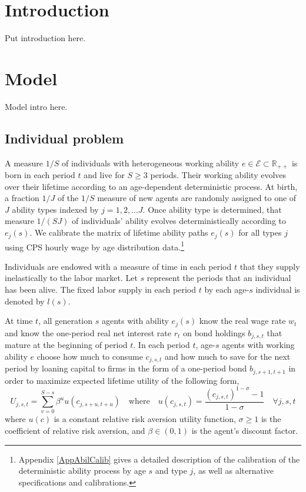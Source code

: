 \documentclass[letterpaper,12pt]{article}
\theoremstyle{definition}
\begin{document}
\begin{spacing}{1.5}

\section{Introduction}\label{SecIntro}

  Put introduction here.


\section{Model}\label{SecModel}

  Model intro here.


  \subsection{Individual problem}\label{SecIndProb}

    A measure $1/S$ of individuals with heterogeneous working ability $e \in\mathcal{E}\subset\mathbb{R}_{++}$ is born in each period $t$ and live for $S\geq 3$ periods. Their working ability evolves over their lifetime according to an age-dependent deterministic process. At birth, a fraction $1/J$ of the $1/S$ measure of new agents are randomly assigned to one of $J$ ability types indexed by $j=1,2,...J$. Once ability type is determined, that measure $1/(SJ)$ of individuals' ability evolves deterministically according to $e_j(s)$. We calibrate the matrix of lifetime ability paths $e_j(s)$ for all types $j$ using CPS hourly wage by age distribution data.\footnote{Appendix \ref{AppAbilCalib} gives a detailed description of the calibration of the deterministic ability process by age $s$ and type $j$, as well as alternative specifications and calibrations.}

    Individuals are endowed with a measure of time in each period $t$ that they supply inelastically to the labor market. Let $s$ represent the periods that an individual has been alive. The fixed labor supply in each period $t$ by each age-$s$ individual is denoted by $l(s)$.

    At time $t$, all generation $s$ agents with ability $e_j(s)$ know the real wage rate $w_t$ and know the one-period real net interest rate $r_t$ on bond holdings $b_{j,s,t}$ that mature at the beginning of period $t$. In each period $t$, age-$s$ agents with working ability $e$ choose how much to consume $c_{j,s,t}$ and how much to save for the next period by loaning capital to firms in the form of a one-period bond $b_{j,s+1,t+1}$ in order to maximize expected lifetime utility of the following form,
    \begin{equation}\label{EqUtilMax}
      U_{j,s,t} = \sum_{v=0}^{S-s}\beta^u u\left(c_{j,s+u,t+u}\right) \quad \text{where} \quad u\left(c_{j,s,t}\right) = \frac{\left(c_{j,s,t}\right)^{1-\sigma} - 1}{1-\sigma} \quad\forall j,s,t
    \end{equation}
    where $u(c)$ is a constant relative risk aversion utility function, $\sigma\geq 1$ is the coefficient of relative risk aversion, and $\beta\in(0,1)$ is the agent's discount factor.


\end{spacing}
\end{document}
